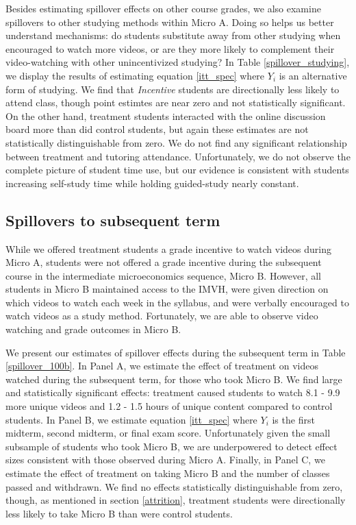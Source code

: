 \documentclass[12pt]{article}
\begin{document}
Besides estimating spillover effects on other course grades, we also examine spillovers to other studying methods within Micro A. Doing so helps us better understand mechanisms: do students substitute away from other studying when encouraged to watch more videos, or are they more likely to complement their video-watching with other unincentivized studying? In Table \ref{spillover_studying}, we display the results of estimating equation \ref{itt_spec} where $Y_i$ is an alternative form of studying. We find that \textit{Incentive} students are directionally less likely to attend class, though point estimtes are near zero and not statistically significant. On the other hand, treatment students interacted with the online discussion board more than did control students, but again these estimates are not statistically distinguishable from zero. We do not find any significant relationship between treatment and tutoring attendance. Unfortunately, we do not observe the complete picture of student time use, but our evidence is consistent with students increasing self-study time while holding guided-study nearly constant.

\subsection{Spillovers to subsequent term}

While we offered treatment students a grade incentive to watch videos during Micro A, students were not offered a grade incentive during the subsequent course in the intermediate microeconomics sequence, Micro B. However, all students in Micro B maintained access to the IMVH, were given direction on which videos to watch each week in the syllabus, and were verbally encouraged to watch videos as a study method. Fortunately, we are able to observe video watching and grade outcomes in Micro B.

We present our estimates of spillover effects during the subsequent term in Table \ref{spillover_100b}. In Panel A, we estimate the effect of treatment on videos watched during the subsequent term, for those who took Micro B. We find large and statistically significant effects: treatment caused students to watch 8.1 - 9.9 more unique videos and 1.2 - 1.5 hours of unique content compared to control students. In Panel B, we estimate equation \ref{itt_spec} where $Y_i$ is the first midterm, second midterm, or final exam score. Unfortunately given the small subsample of students who took Micro B, we are underpowered to detect effect sizes consistent with those observed during Micro A. Finally, in Panel C, we estimate the effect of treatment on taking Micro B and the number of classes passed and withdrawn. We find no effects statistically distinguishable from zero, though, as mentioned in section \ref{attrition}, treatment students were directionally less likely to take Micro B than were control students.
\end{document}
